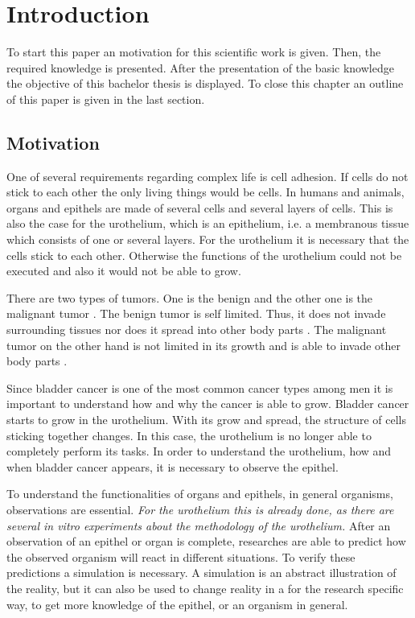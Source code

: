 \chapter{Introduction}
To start this paper an motivation for this scientific work is given. Then, the required knowledge is presented. After the presentation of the basic knowledge the objective of this bachelor thesis is displayed. To close this chapter an outline of this paper is given in the last section.

\section{Motivation}
One of several requirements regarding complex life is cell adhesion. If cells do not stick to each other the only living things would be cells. 
In humans and animals, organs and epithels are made of several cells and several layers of cells. This is also the case for the urothelium, which is an epithelium, i.e. a membranous tissue which consists of one or several layers. For the urothelium it is necessary that the cells stick to each other. Otherwise the functions of the urothelium could not be executed and also it would not be able to grow.

There are two types of tumors. One is the benign and the other one is the malignant tumor \cite{Poplawski2009}. The benign tumor is self limited. Thus, it does not invade surrounding tissues nor does it spread into other body parts \cite{Poplawski2009}. The malignant tumor on the other hand is not limited in its growth and is able to invade other body parts \cite{Poplawski2009}. 

Since bladder cancer is one of the most common cancer types among men it is important to understand how and why the cancer is able to grow. \newline
Bladder cancer starts to grow in the urothelium. With its grow and spread, the structure of cells sticking together changes. In this case, the urothelium is no longer able to completely perform its tasks. In order to understand the urothelium, how and when bladder cancer appears, it is necessary to observe the epithel.

To understand the functionalities of organs and epithels, in general organisms, observations are essential. \textit{For the urothelium this is already done, as there are several in vitro experiments about the methodology of the urothelium.} After an observation of an epithel or organ is complete, researches are able to predict how the observed organism will react in different situations. To verify these predictions a simulation is necessary. A simulation is an abstract illustration of the reality, but it can also be used to change reality in a for the research specific way, to get more knowledge of the epithel, or an organism in general.

